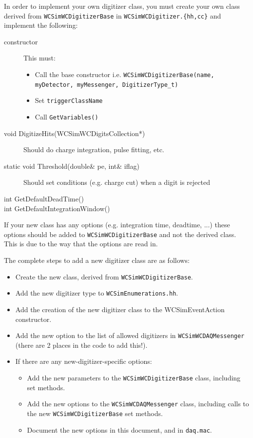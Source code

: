 In order to implement your own digitizer class, you must create your own class derived from \texttt{WCSimWCDigitizerBase} in \texttt{WCSimWCDigitizer.\{hh,cc\}} and implement the following:
\begin{description}
\item[constructor] This must:
  \begin{itemize}
  \item Call the base constructor i.e. \texttt{WCSimWCDigitizerBase(name, myDetector, myMessenger, DigitizerType\_t)}
  \item Set \texttt{triggerClassName}
  \item Call \texttt{GetVariables()}
  \end{itemize}
\item[void DigitizeHits(WCSimWCDigitsCollection*)] Should do charge integration, pulse fitting, etc.
\item[static void Threshold(double\& pe, int\& iflag)] Should set conditions (e.g. charge cut) when a digit is rejected
\item[int GetDefaultDeadTime()]
\item[int GetDefaultIntegrationWindow()]
\end{description}
If your new class has any options (e.g. integration time, deadtime, ...) these options should be added to \texttt{WCSimWCDigitizerBase} and not the derived class. This is due to the way that the options are read in.

The complete steps to add a new digitizer class are as follows:
\begin{itemize}
\item Create the new class, derived from \texttt{WCSimWCDigitizerBase}.
\item Add the new digitizer type to \texttt{WCSimEnumerations.hh}.
\item Add the creation of the new digitizer class to the WCSimEventAction constructor.
\item Add the new option to the list of allowed digitizers in \texttt{WCSimWCDAQMessenger} (there are 2 places in the code to add this!). 
\item If there are any new-digitizer-specific options:
  \begin{itemize}
  \item Add the new parameters to the \texttt{WCSimWCDigitizerBase} class, including set methods.
  \item Add the new options to the \texttt{WCSimWCDAQMessenger} class, including calls to the new \texttt{WCSimWCDigitizerBase} set methods.
  \item Document the new options in this document, and in \texttt{daq.mac}.
  \end{itemize}
\end{itemize}

